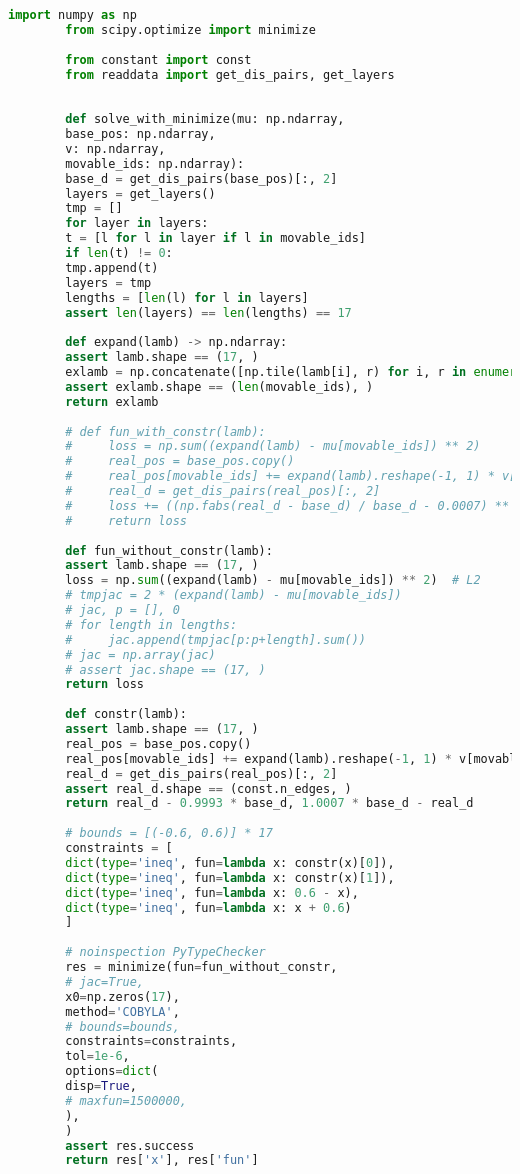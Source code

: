 \documentclass[withoutpreface,bwprint,fontset=macnew]{cumcmthesis} %
\begin{document}
\begin{appendices}
	\begin{lstlisting}[language=python]
		import numpy as np
		from scipy.optimize import minimize
		
		from constant import const
		from readdata import get_dis_pairs, get_layers
		
		
		def solve_with_minimize(mu: np.ndarray,
		base_pos: np.ndarray,
		v: np.ndarray,
		movable_ids: np.ndarray):
		base_d = get_dis_pairs(base_pos)[:, 2]
		layers = get_layers()
		tmp = []
		for layer in layers:
		t = [l for l in layer if l in movable_ids]
		if len(t) != 0:
		tmp.append(t)
		layers = tmp
		lengths = [len(l) for l in layers]
		assert len(layers) == len(lengths) == 17
		
		def expand(lamb) -> np.ndarray:
		assert lamb.shape == (17, )
		exlamb = np.concatenate([np.tile(lamb[i], r) for i, r in enumerate([len(l) for l in layers])])
		assert exlamb.shape == (len(movable_ids), )
		return exlamb
		
		# def fun_with_constr(lamb):
		#     loss = np.sum((expand(lamb) - mu[movable_ids]) ** 2)
		#     real_pos = base_pos.copy()
		#     real_pos[movable_ids] += expand(lamb).reshape(-1, 1) * v[movable_ids]
		#     real_d = get_dis_pairs(real_pos)[:, 2]
		#     loss += ((np.fabs(real_d - base_d) / base_d - 0.0007) ** 2).sum()
		#     return loss
		
		def fun_without_constr(lamb):
		assert lamb.shape == (17, )
		loss = np.sum((expand(lamb) - mu[movable_ids]) ** 2)  # L2
		# tmpjac = 2 * (expand(lamb) - mu[movable_ids])
		# jac, p = [], 0
		# for length in lengths:
		#     jac.append(tmpjac[p:p+length].sum())
		# jac = np.array(jac)
		# assert jac.shape == (17, )
		return loss
		
		def constr(lamb):
		assert lamb.shape == (17, )
		real_pos = base_pos.copy()
		real_pos[movable_ids] += expand(lamb).reshape(-1, 1) * v[movable_ids]
		real_d = get_dis_pairs(real_pos)[:, 2]
		assert real_d.shape == (const.n_edges, )
		return real_d - 0.9993 * base_d, 1.0007 * base_d - real_d
		
		# bounds = [(-0.6, 0.6)] * 17
		constraints = [
		dict(type='ineq', fun=lambda x: constr(x)[0]),
		dict(type='ineq', fun=lambda x: constr(x)[1]),
		dict(type='ineq', fun=lambda x: 0.6 - x),
		dict(type='ineq', fun=lambda x: x + 0.6)
		]
		
		# noinspection PyTypeChecker
		res = minimize(fun=fun_without_constr,
		# jac=True,
		x0=np.zeros(17),
		method='COBYLA',
		# bounds=bounds,
		constraints=constraints,
		tol=1e-6,
		options=dict(
		disp=True,
		# maxfun=1500000,
		),
		)
		assert res.success
		return res['x'], res['fun']
		

\end{lstlisting}
\end{appendices}
\end{document}
